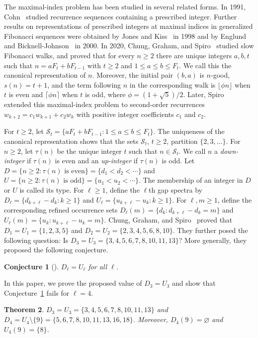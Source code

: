 \documentclass[11pt]{amsart}
\newtheorem{theorem}{Theorem}[section]
\newtheorem{conjecture}[theorem]{Conjecture}
\theoremstyle{definition}
\newcommand{\Scal}{\mathcal S}
\begin{document}
The maximal-index problem has been studied in several related forms. In 1991, Cohn~\cite{Cohn} studied recurrence sequences containing a prescribed integer. Further results on representations of prescribed integers at maximal indices in generalized Fibonacci sequences were obtained by Jones and Kiss~\cite{JonesKiss} in 1998 and by Englund and Bicknell-Johnson~\cite{EnglundBicknell} in 2000. In 2020, Chung, Graham, and Spiro~\cite{CGS} studied slow Fibonacci walks, and proved that for every $n\geq2$ there are unique integers $a,b,t$ such that $n=aF_t+bF_{t-1}$ with $t\geq2$ and $1\leq a\leq b\leq F_t$. We call this the canonical representation of $n$. Moreover, the initial pair $(b,a)$ is $n$-good, $s(n)=t+1$, and the term following $n$ in the corresponding walk is $\lfloor\phi n\rfloor$ when $t$ is even and $\lceil\phi n\rceil$ when $t$ is odd, where $\phi=(1+\sqrt5)/2$. Later, Spiro~\cite{Spiro} extended this maximal-index problem to second-order recurrences $w_{k+2}=c_1w_{k+1}+c_2w_k$ with positive integer coefficients $c_1$ and $c_2$. 

For $t\geq2$, let $\Scal_t=\{aF_t+bF_{t-1}:1\leq a\leq b\leq F_t\}$. The uniqueness of the canonical representation shows that the sets $\Scal_t$, $t\geq2$, partition $\{2,3,\ldots\}$. For $n\geq2$, let $\tau(n)$ be the unique integer $t$ such that $n\in\Scal_t$. We call $n$ a \emph{down-integer} if $\tau(n)$ is even and an
\emph{up-integer} if $\tau(n)$ is odd. Let $D=\{n\geq2:\tau(n)\text{ is even}\}=\{d_1<d_2<\cdots\}$ and $U=\{n\geq2:\tau(n)\text{ is odd}\}=\{u_1<u_2<\cdots\}$. The membership of an integer in $D$ or $U$ is called its type. For $\ell\geq1$, define the $\ell$th gap spectra by $D_\ell=\{d_{k+\ell}-d_k:k\geq1\}$ and $U_\ell=\{u_{k+\ell}-u_k:k\geq1\}$. For $\ell,m\geq1$, define the corresponding refined occurrence sets $D_\ell(m)=\{d_k:d_{k+\ell}-d_k=m\}$ and $U_\ell(m)=\{u_k:u_{k+\ell}-u_k=m\}$. Chung, Graham, and Spiro~\cite{CGS} proved that $D_1=U_1=\{1,2,3,5\}$ and
$D_2=U_2=\{2,3,4,5,6,8,10\}$. They further posed the following question: Is $D_3=U_3=\{3,4,5,6,7,8,10,11,13\}$? More generally, they proposed the following conjecture.
\begin{conjecture}[\cite{CGS}]
\label{conj:spectrum-symmetry}
$D_\ell=U_\ell$ for all $\ell$.
\end{conjecture}

In this paper, we prove the proposed value of $D_3=U_3$ and show that Conjecture~\ref{conj:spectrum-symmetry} fails for $\ell=4$.
\begin{theorem}\label{thm:small-spectra}
$D_3=U_3=\{3,4,5,6,7,8,10,11,13\}$  and $D_4=U_4\setminus\{9\}=\{5,6,7,8,10,11,13,16,18\}$. Moreover, $D_4(9)=\varnothing$ and $U_4(9)=\{8\}$.
\end{theorem}
\end{document}
